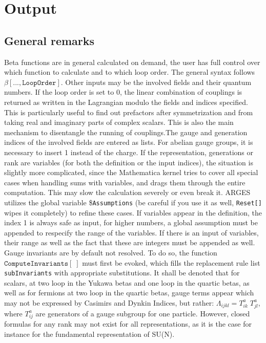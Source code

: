 \documentclass{scrartcl}
\begin{document}
\section{Output}
\subsection{General remarks}
Beta functions are in general calculated on demand, the user has full control over which function to calculate and to which loop order. The general syntax follows $\mathtt{\beta[..., Loop Order]}$. Other inputs may be the involved fields and their quantum numbers. If the loop order is set to 0, the linear combination of couplings is returned as written in the Lagrangian modulo the fields and indices specified. This is particularly useful to find out prefactors after symmetrization and from taking real and imaginary parts of complex scalars. This is also the main mechanism to disentangle the running of couplings.\newline The gauge and generation indices of the involved fields are entered as lists. For abelian gauge groups, it is necessary to insert 1 instead of the charge. If the representation, generations or rank are variables (for both the definition or the input indices), the situation is slightly more complicated, since the Mathematica kernel tries to cover all special cases when handling sums with variables, and drags them through the entire computation. This may slow the calculation severely or even break it. ARGES utilizes the global variable \$\texttt{Assumptions} (be careful if you use it as well, \texttt{Reset[]} wipes it completely) to refine these cases. If variables appear in the definition, the index 1 is always safe as input, for higher numbers, a global assumption must be appended to respecify the range of the variables. If there is an input of variables, their range as well as the fact that these are integers must be appended as well. \newline 
Gauge invariants are by default not resolved. To do so, the function $\mathtt{ComputeInvariants[\;]}$ must first be evoked, which fills the replacement rule list \texttt{subInvariants} with appropriate substitutions. It shall be denoted that for scalars, at two loop in the Yukawa betas and one loop in the quartic betas, as well as for fermions at two loop in the quartic betas, gauge terms appear which may not be expressed by Casimirs and Dynkin Indices, but rather: $ \Lambda_{ijkl} = T ^a_{ik}\;T^a_{jl}$, where $T^a_{ij}$ are generators of a gauge subgroup for one particle. However, closed formulas for any rank may not exist for all representations, as it is the case for instance for the fundamental representation of SU(N).
\end{document}
